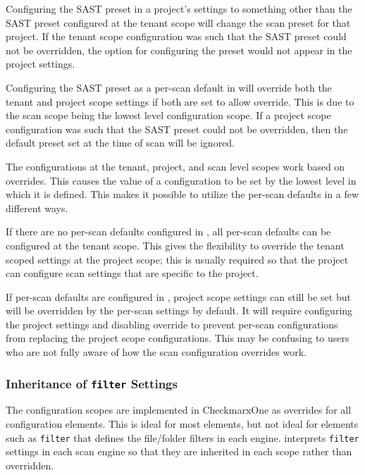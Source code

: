 Configuring the SAST preset in a project's settings to something other than
the SAST preset configured at the tenant scope will change the scan preset for that project.
If the tenant scope configuration was such that the SAST preset could not be overridden, the
option for configuring the preset would not appear in the project settings.

Configuring the SAST preset as a per-scan default in \cxoneflow will override both
the tenant and project scope settings if both are set to allow override.  This is 
due to the scan scope being the lowest level configuration scope.  If a project scope
configuration was such that the SAST preset could not be overridden, then the \cxoneflow
default preset set at the time of scan will be ignored.

The configurations at the tenant, project, and scan level scopes work based on overrides.
This causes the value of a configuration to be set by the lowest level in which it is
defined. This makes it possible to utilize the \cxoneflow per-scan defaults in a few
different ways.

If there are no per-scan defaults configured in \cxoneflow, all per-scan defaults
can be configured at the tenant scope.  This gives the flexibility to override 
the tenant scoped settings at the project scope; this is usually required so that
the project can configure scan settings that are specific to the project.

If per-scan defaults are configured in \cxoneflow, project scope settings can
still be set but will be overridden by the per-scan settings by default.  It will require
configuring the project settings and disabling override to prevent \cxoneflow per-scan
configurations from replacing the project scope configurations.  This may be confusing
to users who are not fully aware of how the scan configuration overrides work.

\subsubsection{\cxoneflow Inheritance of \texttt{filter} Settings}

The configuration scopes are implemented in CheckmarxOne as overrides for all
configuration elements.  This is ideal for most elements, but not ideal for elements
such as \texttt{filter} that defines the file/folder filters in each engine.  \cxoneflow
interprets \texttt{filter} settings in each scan engine so that they are inherited
in each scope rather than overridden.

